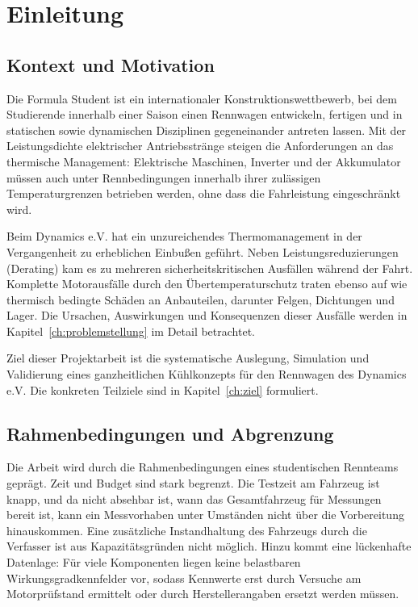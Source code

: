 \chapter{Einleitung}
\label{ch:einleitung}

\section{Kontext und Motivation}
\label{sec:einleitung_kontext}

Die Formula Student ist ein internationaler Konstruktionswettbewerb, bei dem Studierende innerhalb einer Saison einen Rennwagen entwickeln, fertigen und in statischen sowie dynamischen Disziplinen gegeneinander antreten lassen. Mit der Leistungsdichte elektrischer Antriebsstränge steigen die Anforderungen an das thermische Management: Elektrische Maschinen, Inverter und der Akkumulator müssen auch unter Rennbedingungen innerhalb ihrer zulässigen Temperaturgrenzen betrieben werden, ohne dass die Fahrleistung eingeschränkt wird.

Beim Dynamics e.V. hat ein unzureichendes Thermomanagement in der Vergangenheit zu erheblichen Einbußen geführt. Neben Leistungsreduzierungen (Derating) kam es zu mehreren sicherheitskritischen Ausfällen während der Fahrt. Komplette Motorausfälle durch den Übertemperaturschutz traten ebenso auf wie thermisch bedingte Schäden an Anbauteilen, darunter Felgen, Dichtungen und Lager. Die Ursachen, Auswirkungen und Konsequenzen dieser Ausfälle werden in Kapitel~\ref{ch:problemstellung} im Detail betrachtet.

Ziel dieser Projektarbeit ist die systematische Auslegung, Simulation und Validierung eines ganzheitlichen Kühlkonzepts für den Rennwagen des Dynamics e.V. Die konkreten Teilziele sind in Kapitel~\ref{ch:ziel} formuliert.

\section{Rahmenbedingungen und Abgrenzung}
\label{sec:einleitung_abgrenzung}

Die Arbeit wird durch die Rahmenbedingungen eines studentischen Rennteams geprägt. Zeit und Budget sind stark begrenzt. Die Testzeit am Fahrzeug ist knapp, und da nicht absehbar ist, wann das Gesamtfahrzeug für Messungen bereit ist, kann ein Messvorhaben unter Umständen nicht über die Vorbereitung hinauskommen. Eine zusätzliche Instandhaltung des Fahrzeugs durch die Verfasser ist aus Kapazitätsgründen nicht möglich. Hinzu kommt eine lückenhafte Datenlage: Für viele Komponenten liegen keine belastbaren Wirkungsgradkennfelder vor, sodass Kennwerte erst durch Versuche am Motorprüfstand ermittelt oder durch Herstellerangaben ersetzt werden müssen.

